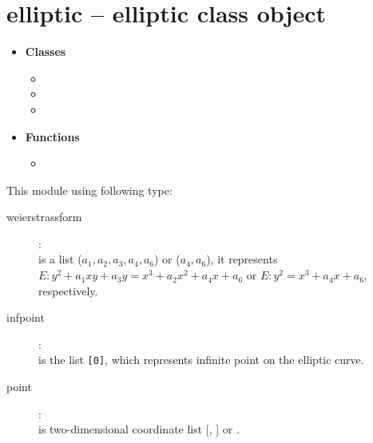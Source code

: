 

 \section{elliptic -- elliptic class object}
 \begin{itemize}
   \item {\bf Classes}
   \begin{itemize}
     \item {}
     \item {}
     \item {}
   \end{itemize}
   \item {\bf Functions}
     \begin{itemize}
       \item {}
     \end{itemize}
 \end{itemize}

 This module using following type:
 \begin{description}
   \item[weierstrassform]:\\
      is a list ($a_1, a_2, a_3, a_4, a_6$) or ($a_4, a_6$), it represents $E:y^2+a_1xy+a_3y=x^3+a_2x^2+a_4x+a_6$ or $E:y^2=x^3+a_4x+a_6$, respectively.
   \item[infpoint]:\\
      is the list {\tt [0]}, which represents infinite point on the elliptic curve.
   \item[point]:\\
      is two-dimensional coordinate list [, ] or .
 \end{description}

\C


